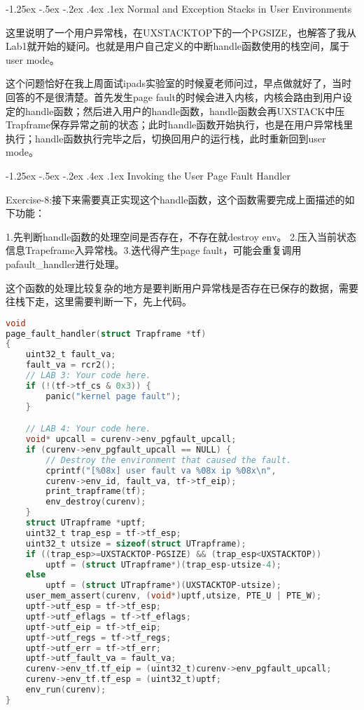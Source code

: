 \documentclass[11pt,a4paper]{article}
\makeatletter
\newcommand{\sihao}{\fontsize{14pt}{\baselineskip}\selectfont}
\renewcommand\subsection{\@startsection{subsection}{1}{\z@}%
{-1.25ex \@plus -.5ex \@minus -.2ex}%
{.4ex \@plus .1ex}%
{\normalfont\sihao\fontspec{黑体}}}
\makeatother
\begin{document}
\subsection{Normal and Exception Stacks in User Environments}

这里说明了一个用户异常栈，在UXSTACKTOP下的一个PGSIZE，也解答了我从Lab1就开始的疑问。也就是用户自己定义的中断handle函数使用的栈空间，属于user mode。

这个问题恰好在我上周面试ipads实验室的时候夏老师问过，早点做就好了，当时回答的不是很清楚。首先发生page fault的时候会进入内核，内核会路由到用户设定的handle函数；然后进入用户的handle函数，handle函数会再UXSTACK中压Trapframe保存异常之前的状态；此时handle函数开始执行，也是在用户异常栈里执行；handle函数执行完毕之后，切换回用户的运行栈，此时重新回到user mode。

\subsection{Invoking the User Page Fault Handler}

\color{red}Exercise-8:\color{black}接下来需要真正实现这个handle函数，这个函数需要完成上面描述的如下功能：

1.先判断handle函数的处理空间是否存在，不存在就destroy env。 2.压入当前状态信息Trapeframe入异常栈。3.迭代得产生page fault，可能会重复调用pafault\_handler进行处理。

这个函数的处理比较复杂的地方是要判断用户异常栈是否存在已保存的数据，需要往栈下走，这里需要判断一下，先上代码。

\setmainfont{Consolas}
\begin{lstlisting}[language={C},firstnumber=1,title=kern/syscall.c] 
void
page_fault_handler(struct Trapframe *tf)
{
	uint32_t fault_va;
	fault_va = rcr2();
	// LAB 3: Your code here.
	if (!(tf->tf_cs & 0x3)) {
		panic("kernel page fault");
	}

	// LAB 4: Your code here.
	void* upcall = curenv->env_pgfault_upcall;
	if (curenv->env_pgfault_upcall == NULL) {
		// Destroy the environment that caused the fault.
		cprintf("[%08x] user fault va %08x ip %08x\n",
		curenv->env_id, fault_va, tf->tf_eip);
		print_trapframe(tf);
		env_destroy(curenv);
	} 
	struct UTrapframe *uptf;
	uint32_t trap_esp = tf->tf_esp;
	uint32_t utsize = sizeof(struct UTrapframe);
	if ((trap_esp>=UXSTACKTOP-PGSIZE) && (trap_esp<UXSTACKTOP))
		uptf = (struct UTrapframe*)(trap_esp-utsize-4);
	else 
		uptf = (struct UTrapframe*)(UXSTACKTOP-utsize);
	user_mem_assert(curenv, (void*)uptf,utsize, PTE_U | PTE_W);
	uptf->utf_esp = tf->tf_esp;
	uptf->utf_eflags = tf->tf_eflags;
	uptf->utf_eip = tf->tf_eip;
	uptf->utf_regs = tf->tf_regs;
	uptf->utf_err = tf->tf_err;
	uptf->utf_fault_va = fault_va;
	curenv->env_tf.tf_eip = (uint32_t)curenv->env_pgfault_upcall;
	curenv->env_tf.tf_esp = (uint32_t)uptf;
	env_run(curenv);
}
\end{lstlisting}
\setmainfont[BoldFont=黑体]{宋体}
\end{document}
